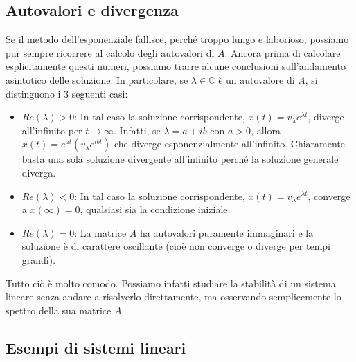 \documentclass[a4paper,openany]{article}
\begin{document}
	\subsection{Autovalori e divergenza}
	Se il metodo dell'esponenziale fallisce, perché troppo lungo e laborioso, possiamo pur sempre ricorrere al calcolo degli autovalori di $A$. Ancora prima di calcolare esplicitamente questi numeri, possiamo trarre alcune conclusioni sull'andamento asintotico delle soluzione. In particolare, se $\lambda \in \mathbb{C}$ è un autovalore di $A$, si distinguono i 3 seguenti casi:
	\begin{itemize}
		\item $Re(\lambda) > 0$: In tal caso la soluzione corrispondente, $x(t) = v_{\lambda}e^{\lambda t}$, diverge all'infinito per $t\to\infty$. Infatti, se $\lambda = a+ib$ con $a>0$, allora $x(t) = e^{at} (v_{\lambda} e^{ibt})$ che diverge esponenzialmente all'infinito. Chiaramente basta una sola soluzione divergente all'infinito perché la soluzione generale diverga.
		\item $Re(\lambda) < 0$: In tal caso la soluzione corrispondente, $x(t) = v_{\lambda}e^{\lambda t}$, converge a $x(\infty) = 0$, qualsiasi sia la condizione iniziale.
		\item $Re(\lambda) = 0$: La matrice $A$ ha autovalori puramente immaginari e la soluzione è di carattere oscillante (cioè non converge o diverge per tempi grandi).
	\end{itemize}
	Tutto ciò è molto comodo. Possiamo infatti studiare la stabilità di un sistema lineare senza andare a risolverlo direttamente, ma osservando semplicemente lo spettro della sua matrice $A$.
	\subsection{Esempi di sistemi lineari}
\end{document}
